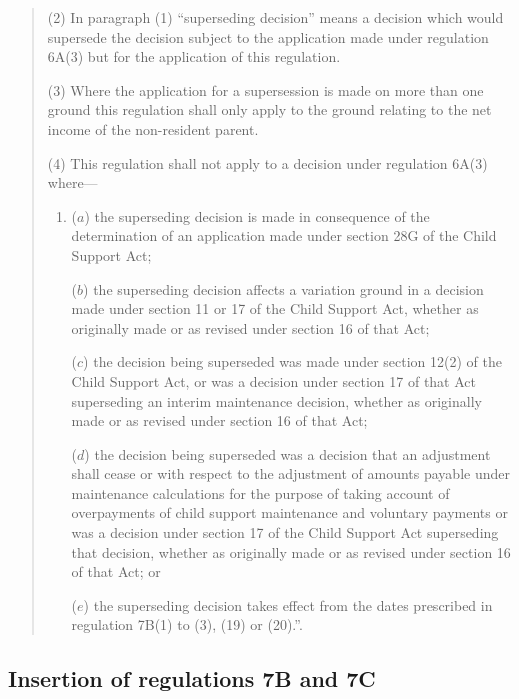 \documentclass[12pt,a4paper]{article}
\begin{document}
\begin{quotation}
(2) In paragraph (1) “superseding decision” means a decision which would supersede the decision subject to the application made under regulation 6A(3) but for the application of this regulation.

(3) Where the application for a supersession is made on more than one ground this regulation shall only apply to the ground relating to the net income of the non-resident parent.

(4) This regulation shall not apply to a decision under regulation 6A(3) where—
\begin{enumerate}\item[]
($a$) the superseding decision is made in consequence of the determination of an application made under section 28G of the Child Support Act;

($b$) the superseding decision affects a variation ground in a decision made under section 11 or 17 of the Child Support Act, whether as originally made or as revised under section 16 of that Act;

($c$) the decision being superseded was made under section 12(2) of the Child Support Act, or was a decision under section 17 of that Act superseding an interim maintenance decision, whether as originally made or as revised under section 16 of that Act;

($d$) the decision being superseded was a decision that an adjustment shall cease or with respect to the adjustment of amounts payable under maintenance calculations for the purpose of taking account of overpayments of child support maintenance and voluntary payments or was a decision under section 17 of the Child Support Act superseding that decision, whether as originally made or as revised under section 16 of that Act; or

($e$) the superseding decision takes effect from the dates prescribed in regulation 7B(1) to (3), (19) or (20).”.
\end{enumerate}
\end{quotation}

\subsection[9. Insertion of regulations 7B and 7C]{Insertion of regulations 7B and 7C}
\end{document}
